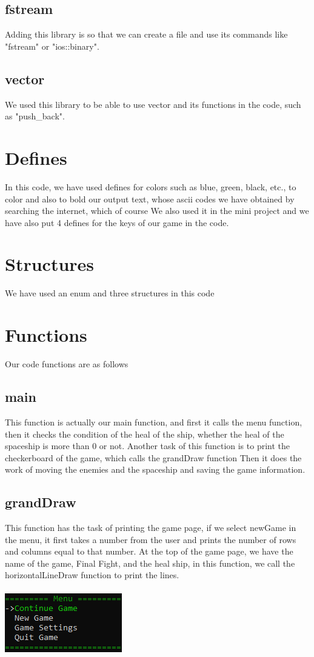 \documentclass[12pt,a4paper]{article}
\begin{document}
	\subsection{fstream}
	Adding this library is so that we can create a file and use its commands like "fstream" or "ios::binary".
	\subsection{vector}
	We used this library to be able to use vector and its functions in the code, such as "push\_back".
	\section{Defines}\label{description.defines}
	In this code, we have used defines for colors such as blue, green, black, etc., to color and also to bold our output text, whose ascii codes we have obtained by searching the internet, 
	which of course We also used it in the mini project and we have also put 4 defines for the keys of our game in the code.
	\section{Structures}\label{description.structs}
	We have used an enum and three structures in this code
	\section{Functions}\label{description.func}
	Our code functions are as follows
	\subsection{main}
	This function is actually our main function, and first it calls the menu function, then it checks the condition of the heal of the ship, whether the heal of the spaceship is more than 0 or not.
    Another task of this function is to print the checkerboard of the game, which calls the grandDraw function
    Then it does the work of moving the enemies and the spaceship and saving the game information.
	
	\subsection{grandDraw}
	This function has the task of printing the game page, if we select newGame in the menu, it first takes a number from the user and prints the number of rows and columns equal to that number.
    At the top of the game page, we have the name of the game, Final Fight, and the heal ship, in this function, we call the horizontalLineDraw function to print the lines.\\ \\
	\includegraphics[scale = 1]{Graphics/menu.png}
\end{document}
